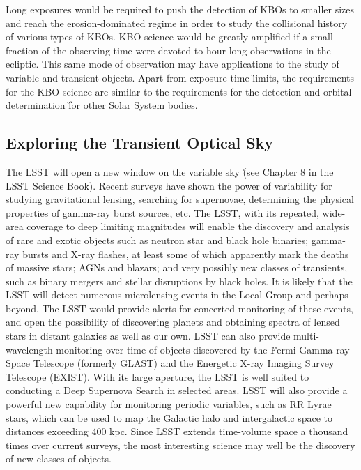 Long exposures would be required to push the detection of KBOs to smaller
sizes and reach the erosion-dominated regime in order to study the
collisional history of various types of KBOs. KBO science would be greatly
amplified if a small fraction of the observing time were devoted to
hour-long observations in the ecliptic. This same mode of observation may
have applications to the study of variable and transient objects. Apart
from exposure time \G{limits},  the requirements for the KBO
science are similar to the requirements for the detection and
orbital determination \G{for other Solar System bodies}.



\subsection{Exploring the Transient Optical Sky}
\label{sec:transients}

The LSST will open a new window on the variable sky \G{(see Chapter 8 in
the LSST Science Book)}. Recent surveys have
shown the power of variability for studying gravitational lensing,
searching for supernovae, determining the physical properties of gamma-ray
burst sources, etc. The LSST, with its repeated, wide-area coverage to deep
limiting magnitudes will enable the discovery and analysis of rare and
exotic objects such as neutron star and black hole binaries; gamma-ray
bursts and X-ray flashes, at least some of which apparently mark the deaths
of massive stars; AGNs and blazars; and very possibly new classes of
transients, such as binary mergers and stellar disruptions by black holes.
It is likely that the LSST will detect
numerous microlensing events in the Local Group and perhaps beyond.  The
LSST would provide alerts for concerted monitoring of these events, and
open the possibility of discovering planets and obtaining spectra of lensed
stars in distant galaxies as well as our own.  LSST can also provide
multi-wavelength monitoring over time of objects discovered by the
\G{Fermi Gamma-ray Space Telescope (formerly GLAST)}
and the Energetic X-ray Imaging Survey Telescope (EXIST). With its large aperture, the LSST is well
suited to conducting a Deep Supernova Search in selected areas.  LSST will
also provide a powerful new capability for monitoring periodic variables,
such as RR Lyrae stars, which can be used to map the Galactic halo and
intergalactic space to distances exceeding 400 kpc. Since LSST extends
time-volume space a thousand times over current surveys, the most
interesting science may well be the discovery of new classes of objects.

